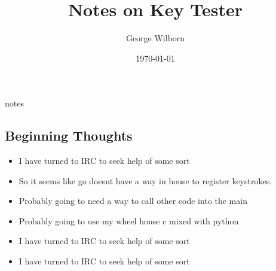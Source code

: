 \documentclass{report}
\author{George Wilborn}
\title{Notes on Key Tester}
\date{\today}
\begin{document}
\maketitle
\secion notes
\subsection{Beginning Thoughts}
\begin{itemize}
  \item I have turned to IRC to seek help of some sort
  \item So it seems like go doesnt have a way in house to register keystrokes.
  \item Probably going to need a way to call other code into the main
  \item Probably going to use my wheel house c mixed with python
  \item I have turned to IRC to seek help of some sort
  \item I have turned to IRC to seek help of some sort
\end{itemize}
\end{document}
